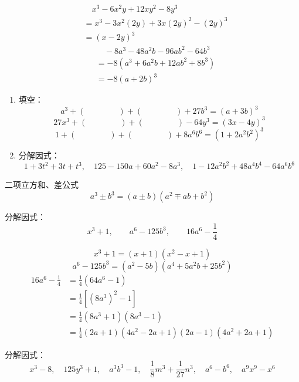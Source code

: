 \begin{solution}
\[\begin{split}
      &\quad       x^3-6x^2y+12xy^2-8y^3\\
      &=x^3-3x^2(2y)+3x(2y)^2-(2y)^3\\
      &=(x-2y)^3
        \end{split}\]
 \[\begin{split}
            &\quad -8a^3-48a^2b-96ab^2-64b^3\\
&=-8(a^3+6a^2b+12ab^2+8b^3)\\
&=-8(a+2b)^3
        \end{split}\]
  
\end{solution}

\begin{ex}
\begin{enumerate}
    \item 填空：
    \[a^3+(\qquad \qquad)+(\qquad\qquad )+27b^3=(a+3b)^3\]
    \[27x^3+(\qquad\qquad)+(\qquad\qquad )-64y^3=(3x-4y)^3\]
    \[1+(\qquad\qquad)+(\qquad\qquad)+8a^6b^6=(1+2a^2b^2)^3\]

\item 分解因式：
\[1+3t^2+3t+t^3,\quad 125-150a+60a^2-8a^3,\quad 1-12a^2b^2+48a^4b^4-64a^6b^6\]
\end{enumerate}    
\end{ex}

\begin{blk}{二项立方和、差公式}
    \[a^3\pm b^3 =(a\pm b)(a^2\mp ab+b^2)\]
\end{blk}

\begin{example}
分解因式：
\[x^3+1,\qquad a^6-125b^3,\qquad 16a^6-\frac{1}{4}\]
\end{example}

\begin{solution}
\[x^3+1=(x+1)(x^2-x+1)\]
\[a^6-125b^3=(a^2-5b)(a^4+5a^2b+25b^2)\]
\[\begin{split}
    16a^6-\frac{1}{4}&=\frac{1}{4}(64a^6-1)\\
    &=\frac{1}{4}\left[(8a^3)^2-1\right]\\
    &=\frac{1}{4}(8a^3+1)(8a^3-1)\\
    &=\frac{1}{4}(2a+1)(4a^2-2a+1)(2a-1)(4a^2+2a+1)
\end{split}\]
\end{solution}

\begin{ex}
    分解因式：
\[x^3-8,\quad 125y^3+1,\quad  a^3b^3-1,\quad \frac{1}{8}m^3+\frac{1}{27}n^3,\quad a^6-b^6,\quad a^9x^9-x^6\]
\end{ex}

